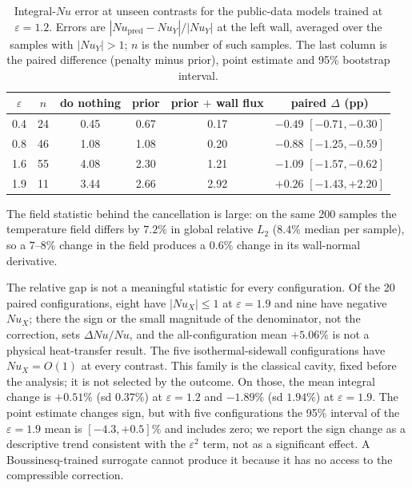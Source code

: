 \documentclass[preprint,11pt,a4paper,times,doubleblind]{elsarticle}
\begin{document}
\begin{table}[htbp]
\centering
\footnotesize
\setlength{\tabcolsep}{4pt}
\caption{Integral-$Nu$ error at unseen contrasts for the public-data models trained at
$\varepsilon=1.2$. Errors are $|Nu_{\mathrm{pred}}-Nu_Y|/|Nu_Y|$ at the left wall, averaged over the
samples with $|Nu_Y|>1$; $n$ is the number of such samples. The last column is the paired
difference (penalty minus prior), point estimate and 95\% bootstrap interval.}
\label{tab:flux_cross}
\begin{tabular}{@{}cccccc@{}}
\toprule
$\varepsilon$ & $n$ & do nothing & prior & prior $+$ wall flux & paired $\Delta$ (pp)\\
\midrule
0.4 & 24 & 0.45 & 0.67 & 0.17 & $-0.49$ $[-0.71,-0.30]$\\
0.8 & 46 & 1.08 & 1.08 & 0.20 & $-0.88$ $[-1.25,-0.59]$\\
1.6 & 55 & 4.08 & 2.30 & 1.21 & $-1.09$ $[-1.57,-0.62]$\\
1.9 & 11 & 3.44 & 2.66 & 2.92 & $+0.26$ $[-1.43,+2.20]$\\
\bottomrule
\end{tabular}
\end{table}

The field statistic behind the cancellation is large: on the same 200
samples the temperature field differs by $7.2\%$ in global relative $L_2$ ($8.4\%$ median per
sample), so a $7$--$8\%$ change in the field produces a $0.6\%$ change in its wall-normal
derivative.

The relative gap is not a meaningful statistic for every configuration. Of the 20 paired
configurations, eight have $|Nu_X|\le1$ at $\varepsilon=1.9$ and nine have negative $Nu_X$; there
the sign or the small magnitude of the denominator, not the correction, sets $\Delta Nu/Nu$, and the all-configuration mean
$+5.06\%$ is not a physical heat-transfer result. The five isothermal-sidewall configurations have
$Nu_X=O(1)$ at every contrast. This family is the classical cavity, fixed before the analysis;
it is not selected by the outcome. On those, the mean integral change is $+0.51\%$ (sd $0.37\%$)
at $\varepsilon=1.2$ and $-1.89\%$ (sd $1.94\%$) at $\varepsilon=1.9$. The point estimate changes
sign, but with five configurations the 95\% interval of the $\varepsilon=1.9$ mean is
$[-4.3,+0.5]\%$ and includes zero; we report the sign change as a descriptive trend consistent
with the $\varepsilon^2$ term, not as a significant effect. A Boussinesq-trained surrogate cannot
produce it because it has no access to the compressible correction.
\end{document}
